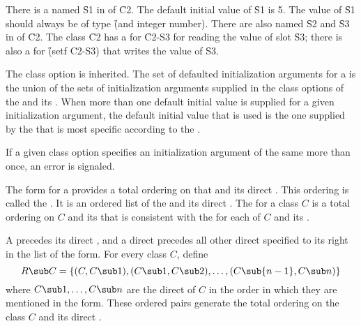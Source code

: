 There is a  named \f{S1} in  of \f{C2}.
The default initial value of \f{S1} is 5.
The value of \f{S1} should always be of type \f{(and integer number)}.
There are also  named \f{S2} and \f{S3} in  of \f{C2}.
The class \f{C2} has a  for \f{C2-S3} for reading the value of slot \f{S3};
there is also a  for \f{(setf C2-S3)} that writes the value of \f{S3}.

\endsubsubsection%

     
The  class option is inherited.  The set of
defaulted initialization arguments for a  is the union of the
sets of initialization arguments supplied in
the  class options of the  and its .
When more than one default initial value  is supplied for a given
initialization argument, the default initial value  that is used
is the one supplied by the  that is most specific according to
the .


If a given  class option specifies an
initialization argument of the same  more than once, an
error  is signaled.

\endsubsubsection%


\endsubSection%



The  form for a  provides a total ordering
on that  and its direct .  This ordering is
called the .  It is an ordered list of the
 and its direct . The
 for a class $C$ is a total ordering on
$C$ and its  that is consistent with the
 for each of $C$ and its .

A  precedes its direct , 
and a direct  precedes all other 
direct  specified to its right 
in the  list of the  form.  
For every class $C$, define $$R\sub C=\{(C,C\sub 1),(C\sub 1,C\sub
2),\ldots,(C\sub {n-1},C\sub n)\}$$ where $C\sub 1,\ldots,C\sub n$ are
the direct  of $C$ in the order in which
they are mentioned in the  form. These ordered pairs
generate the total ordering on the class $C$ and its direct
.


